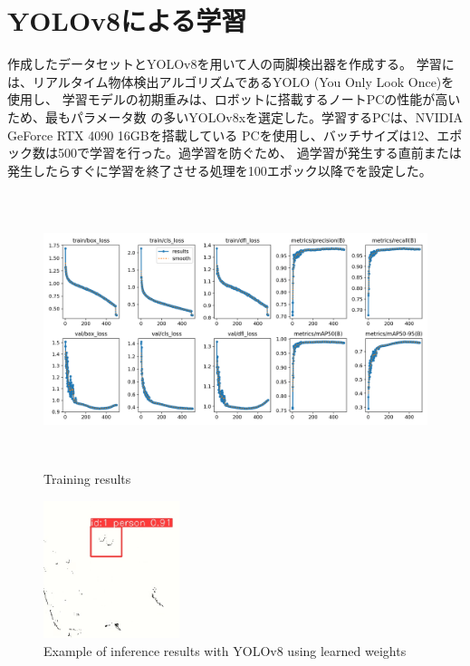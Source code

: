 \section{YOLOv8による学習}
作成したデータセットとYOLOv8を用いて人の両脚検出器を作成する。
学習には、リアルタイム物体検出アルゴリズムであるYOLO (You Only Look Once)を使用し、
学習モデルの初期重みは、ロボットに搭載するノートPCの性能が高いため、最もパラメータ数
の多いYOLOv8xを選定した。学習するPCは、NVIDIA GeForce RTX 4090 16GBを搭載している
PCを使用し、バッチサイズは12、エポック数は500で学習を行った。過学習を防ぐため、
過学習が発生する直前または発生したらすぐに学習を終了させる処理を100エポック以降でを設定した。

\begin{figure}[h]
    \begin{center}
    \includegraphics[height=80mm,clip]{figure/yolov8-train-results.png}
    \caption{Training results}
    \label{Training results}
    \end{center}
\end{figure}

\begin{figure}[h]
    \begin{center}
    \includegraphics[height=40mm,clip]{figure/yolov8_laser_img.png}
    \caption{Example of inference results with YOLOv8 using learned weights}
    \label{Example of inference results with YOLOv8 using learned weights}
    \end{center}
\end{figure}

